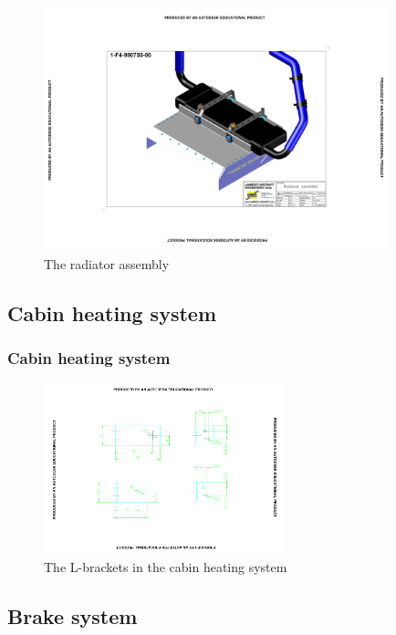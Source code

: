 \documentclass{beamer}
\begin{document}
\begin{frame}
\begin{figure}[ht!]
	\begin{center}
		\includegraphics[width=10cm,trim = 5cm 5cm 5cm 5cm, clip]{pics/PIC008.pdf}
		\caption{The radiator assembly}
		\label{fig:PIC008}
	\end{center}
\end{figure}
\end{frame}

\subsection{Cabin heating system}

\begin{frame}\frametitle{Cabin heating system}
\begin{figure}[ht!]
	\begin{center}
		\includegraphics[width=7cm,trim = 6cm 4cm 6cm 3cm, clip]{pics/PIC009.pdf}
		\caption{The L-brackets in the cabin heating system}
		\label{fig:PIC009}
	\end{center}
\end{figure}
\end{frame}

\subsection{Brake system}
\end{document}
